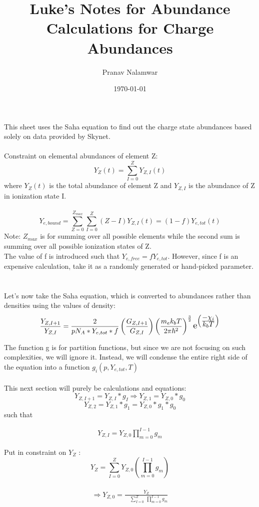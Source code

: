 \documentclass[11pt,a4paper]{article}
\begin{document}
\title{Luke's Notes for Abundance Calculations for Charge Abundances}
\author{Pranav Nalamwar}
\date{\today}
\maketitle   This sheet uses the Saha equation to find out the charge state abundances based solely on data provided by Skynet.
\\
\\
Constraint on elemental abundances of element Z:
$$Y_Z (t) = \sum_{I=0}^{Z} Y_{Z,I}(t)$$
where $Y_Z (t)$ is the total abundance of element Z and $Y_{Z,I}$ is the abundance of Z in ionization state I.
\\
\\
$$Y_{e,bound} = \sum_{Z=0}^{Z_{max}} \sum_{I=0}^{Z} (Z - I) Y_{Z,I}(t) = (1-f) Y_{e,tot}(t) $$
Note: $Z_{max}$ is for summing over all possible elements while the second sum is summing over all possible ionization states of Z. 
\\The value of f is introduced such that $Y_{e,free} = f Y_{e,tot}$. However, since f is an expensive calculation, take it as a randomly generated or hand-picked parameter. 
\\\\\\Let's now take the Saha equation, which is converted to abundances rather than densities using the values of density: $$\frac{Y_{Z,I+1}}{Y_{Z,I}}  = \frac{2}{pN_A * Y_{e,tot}*f}  \left(\frac{G_{Z,I+1}}{G_{Z,I}}\right) \left(\frac{m_e k_b T}{2\pi\hbar^2}\right)^\frac{3}{2} \scalebox{1.3} e^{\left(\frac{\displaystyle -\chi_i}{\displaystyle k_b T}\right)} $$


The function g is for partition functions, but since we are not focusing on such complexities, we will ignore it. Instead, we will condense the entire right side of the equation into a function $g_i (p,Y_{e,tot},T) $
\\\\
This next section will purely be calculations and equations: $$ Y_{Z,I+1} = Y_{Z,I} * g_I \Longrightarrow  Y_{Z,1} = Y_{Z,0}*g_0 $$   $$ Y_{Z,2} = Y_{Z,1}*g_1 = Y_{Z,0}*g_1 * g_0 $$
such that 

\begin{align} 
Y_{Z,I} = Y_{Z,0} \prod_{m=0}^{I - 1} g_m 
\end{align}

Put in constraint on $Y_Z$ : $$ Y_Z = \sum_{I=0}^{Z} Y_{Z,0} \left(\prod_{m=0}^{I - 1} g_m\right) $$\\
\begin{align} 
\Longrightarrow Y_{Z,0} = \frac{Y_Z}{\quad \displaystyle \sum_{I=0}^{Z} \medspace \prod_{m=0}^{I - 1} g_m}
\end{align}
\end{document}
